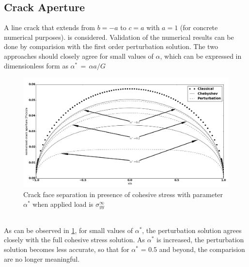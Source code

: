 \documentclass[authoryear,12pt]{elsarticle}
\begin{document}
		\subsection{Crack Aperture}
			A line crack that extends from \(b = -a\) to \(c = a\) with \(a = 1\) (for concrete numerical purposes). is considered. Validation of the numerical results can be done by comparision with the first order perturbation solution. The two approaches should closely agree for small values of \(\alpha\), which can be expressed in dimensionless form as \(\alpha ^{*}\,=\,\alpha a /G \) \\
		\begin{figure}[h!]
            \includegraphics[width=1\linewidth]{Result.png}
            \caption{Crack face separation in presence of cohesive stress with parameter \(\alpha^*\) when applied load is \(\sigma_{yy}^{\infty}\)}
			\label{Result}
        \end{figure}
		\\
    As can be observed in \cref{Result}, for small values of \(\alpha^*\), the perturbation solution agrees closely with the full cohesive stress solution. As \(\alpha^*\) is increased, the perturbation solution becomes less accurate, so that for \(\alpha^*\) = 0.5 and beyond, the comparision are no longer meaningful.
	\newpage
\end{document}
